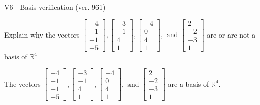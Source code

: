 \begin{exercise}
  \begin{exerciseTitle}V6 - Basis verification (ver. 961)\end{exerciseTitle}
  \begin{exerciseStatement}
    Explain why the vectors \(\left[\begin{array}{r}
-4 \\
-1 \\
-1 \\
-5
\end{array}\right] , \left[\begin{array}{r}
-3 \\
-1 \\
4 \\
1
\end{array}\right] , \left[\begin{array}{r}
-4 \\
0 \\
4 \\
1
\end{array}\right] , \text{ and } \left[\begin{array}{r}
2 \\
-2 \\
-3 \\
1
\end{array}\right]\) are or are not a basis of \(\mathbb{R}^4\)	


  \end{exerciseStatement}
  \begin{exerciseAnswer}
   The vectors \(\left[\begin{array}{r}
-4 \\
-1 \\
-1 \\
-5
\end{array}\right] , \left[\begin{array}{r}
-3 \\
-1 \\
4 \\
1
\end{array}\right] , \left[\begin{array}{r}
-4 \\
0 \\
4 \\
1
\end{array}\right] , \text{ and } \left[\begin{array}{r}
2 \\
-2 \\
-3 \\
1
\end{array}\right]\) 
  	 are  a basis of \(\mathbb{R}^4\).
  


  \end{exerciseAnswer}
\end{exercise}